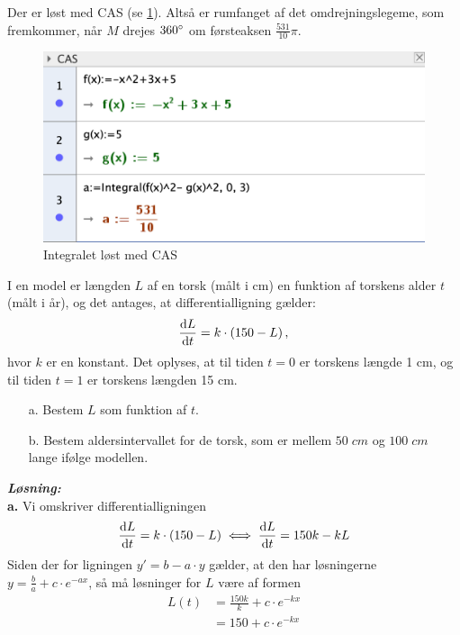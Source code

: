 \documentclass{article}
\newcommand{\sol}{\setlength{\parindent}{0cm}\textbf{\textit{Løsning:}}\setlength{\parindent}{1cm}}
\begin{document}
Der er løst med CAS (se \cref{fig:CAS}).
Altså er rumfanget af det omdrejningslegeme, som fremkommer, når $M$ drejes $360 \degree $ om førsteaksen $\frac{531}{10} \pi $.
\begin{figure}[H]
\begin{center}
  \includegraphics[width=\textwidth]{CAS.png}
\end{center}
\caption{Integralet løst med CAS}
\label{fig:CAS}
\end{figure}
\begin{question}{}{}
  I en model er længden $L$ af en torsk (målt i cm) en funktion af torskens alder $t$ (målt i år), og det antages, at differentialligning gælder:
  \[
  \dv{L}{t}=k \cdot \left(150-L\right), 
  \] 
  hvor $k$ er en konstant. 
Det oplyses, at til tiden $t = 0$ er torskens længde 1 cm, og til tiden $t = 1$ er torskens længden 15 cm.
\begin{itemize}
  \item[a.] Bestem $L$ som funktion af $t$.
  \item[b.] Bestem aldersintervallet for de torsk, som er mellem $50 \;\unit{cm} $ og $100 \;\unit{cm} $ lange ifølge modellen. 
\end{itemize}
\end{question}
\sol \\
\textbf{a.}
Vi omskriver differentialligningen 
\begin{equation*}
\begin{split}
  \dv{L}{t}=k \cdot \left(150-L\right) \iff \dv{L}{t}=150k - kL
\end{split}
\end{equation*}
Siden der for ligningen $y'=b-a \cdot y$ gælder, at den har løsningerne $y=\frac{b}{a}+c \cdot e^{-ax} $, så må løsninger for $L$ være af formen
\begin{equation*}
\begin{split}
  L(t)&=\frac{150k}{k}+c \cdot e^{-kx}\\
  &=150 + c \cdot e^{-kx} 
\end{split}
\end{equation*}
\end{document}
